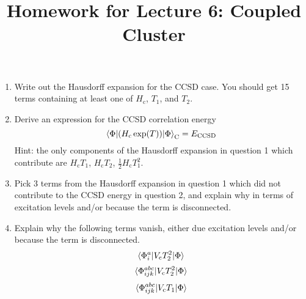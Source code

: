 \documentclass{article}
\title{Homework for Lecture 6: Coupled Cluster}
\date{}
\newcommand{\Hc}{H_{\mathrm{c}}}
\newcommand{\mr}{\mathrm}
\begin{document}
\maketitle
\noindent
\begin{enumerate}
\item Write out the Hausdorff expansion for the CCSD case. You should get 15 terms 
containing at least one of $\Hc$, $T_1$, and $T_2$. 
\item Derive an expression for the CCSD correlation energy 
\[ \braket{\Phi| (\Hc \exp(T))| \Phi}_\mathrm{C}  = E_{\mathrm{CCSD}} \]
Hint: the only components of the Hausdorff expansion in question 1 which contribute
are $\Hc T_1$,  $\Hc T_2$,  $ \frac{1}{2}\Hc T_1^2$.  

\item Pick 3 terms from the Hausdorff expansion in question 1 which did not contribute to 
the CCSD energy in question 2, and explain why in terms of excitation levels and/or because the term is disconnected.

\item Explain why the following terms vanish, either due excitation levels
and/or because the term is disconnected.
\[ \braket{\Phi_i^a | V_\mr{c} T_2^2 | \Phi} \]
\[ \braket{\Phi_{ijk}^{abc} | V_\mr{c} T_2^2 | \Phi} \]
\[ \braket{\Phi_{ijk}^{abc} | V_\mr{c} T_1 | \Phi} \]

\end{enumerate}
\end{document}
